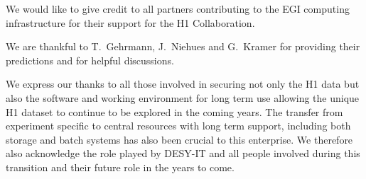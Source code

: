 \documentclass[12pt]{article}
\begin{document}
We would like to give credit to all partners contributing to the EGI computing infrastructure for their support for the H1 Collaboration. 

We are thankful to T.~Gehrmann, J.~Niehues and G.~Kramer for providing their predictions and for helpful discussions.

We express our thanks to all those involved in securing not only the H1 data but also the software and working environment for long term use allowing the unique H1 dataset to continue to be explored in the coming years. The transfer from experiment specific to central resources with long term support, including both storage and batch systems has also been crucial to this enterprise. We therefore also acknowledge the role played by DESY-IT and all people involved during this transition and their future role in the years to come. 





\clearpage
%
%
%
\end{document}
